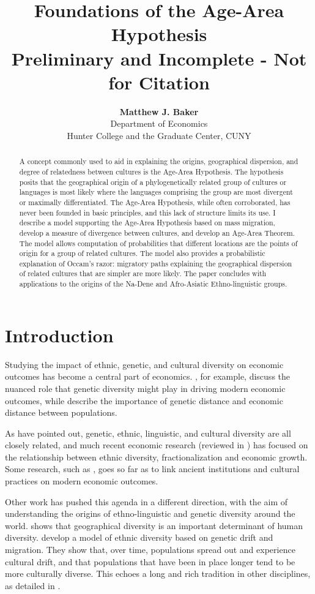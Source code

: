 \documentclass[11pt]{article}
\title{Foundations of the Age-Area Hypothesis \\ \large{Preliminary and Incomplete - Not for Citation}}
\author{\textbf{Matthew J. Baker} \\ Department of Economics \\ Hunter College and the Graduate Center, CUNY}
\begin{document}
\maketitle
\begin{abstract}
\noindent A concept commonly used to aid in explaining the origins, geographical dispersion, and degree of relatedness between cultures is the Age-Area Hypothesis. The hypothesis posits that the geographical origin of a phylogenetically related group of cultures or languages is most likely where the languages comprising the group are most divergent or maximally differentiated. The Age-Area Hypothesis, while often corroborated, has never been founded in basic principles, and this lack of structure limits its use. I describe a model supporting the Age-Area Hypothesis based on mass migration, develop a measure of divergence between cultures, and develop an Age-Area Theorem. The model allows computation of probabilities that different locations are the points of origin for a  group of related cultures. The model also provides a probabilistic explanation of Occam's razor: migratory paths explaining the geographical dispersion of related cultures that are simpler are  more likely. The paper concludes with applications to the origins of the Na-Dene and Afro-Asiatic Ethno-linguistic groups. 
\end{abstract}
\newpage

\section{Introduction}
Studying the impact of ethnic, genetic, and cultural diversity on economic outcomes has become a central part of economics. \cite{ashraf13}, for example, discuss the nuanced role that genetic diversity might play in driving modern economic outcomes, while \cite{spolaore09} describe the importance of genetic distance and economic distance between populations. 

As \cite{cavalli95} have pointed out, genetic, ethnic, linguistic, and cultural diversity are all closely related, and much recent economic research (reviewed in \cite{alesina05}) has focused on the relationship between ethnic diversity, fractionalization and economic growth. Some research, such as \cite{spolaore13}, goes so far as to link ancient institutions and cultural practices on modern economic outcomes. 

Other work has pushed this agenda in a different direction, with the aim of understanding the origins of ethno-linguistic and genetic diversity around the world.   \cite{michalopoulos12} shows that geographical diversity is an important determinant of human diversity.  \cite{ahlerup12} develop a model of ethnic diversity based on genetic drift and migration. They show that, over time, populations spread out and experience cultural drift, and that populations that have been in place longer tend to be more culturally diverse. This echoes a long and rich tradition in other disciplines, as detailed in  \cite{mace05}. 
\end{document}
